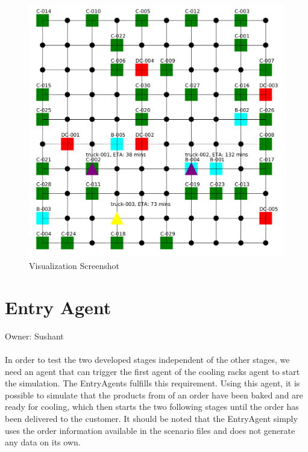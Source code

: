 \documentclass[11pt, a4paper]{article}
\begin{document}
\begin{figure}[h!]
	\centering
	\includegraphics[width=\textwidth]{Visualization.png}
	\caption{Visualization Screenshot}
	\label{PackagingArchitecture}
\end{figure}

\newpage
\section{Entry Agent}
Owner: Sushant
\paragraph{}
In order to test the two developed stages independent of the other stages, we need an agent that can trigger the first agent of the cooling racks agent to start the simulation. The EntryAgents fulfills this requirement. Using this agent, it is possible to simulate that the products from of an order have been baked and are ready for cooling, which then starts the two following stages until the order has been delivered to the customer. It should be noted that the EntryAgent simply uses the order information available in the scenario files and does not generate any data on its own.
\end{document}

